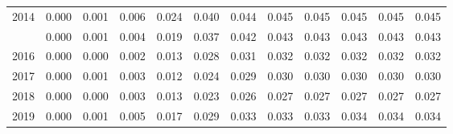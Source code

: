 \documentclass[
]{article}
\begin{document}
\begin{longtable}[t]{lrrrrrrrrrrr}
2014 & 0.000 & 0.001 & 0.006 & 0.024 & 0.040 & 0.044 & 0.045 & 0.045 & 0.045 & 0.045 & 0.045\\
\addlinespace
2015 & 0.000 & 0.001 & 0.004 & 0.019 & 0.037 & 0.042 & 0.043 & 0.043 & 0.043 & 0.043 & 0.043\\
2016 & 0.000 & 0.000 & 0.002 & 0.013 & 0.028 & 0.031 & 0.032 & 0.032 & 0.032 & 0.032 & 0.032\\
2017 & 0.000 & 0.001 & 0.003 & 0.012 & 0.024 & 0.029 & 0.030 & 0.030 & 0.030 & 0.030 & 0.030\\
2018 & 0.000 & 0.000 & 0.003 & 0.013 & 0.023 & 0.026 & 0.027 & 0.027 & 0.027 & 0.027 & 0.027\\
2019 & 0.000 & 0.001 & 0.005 & 0.017 & 0.029 & 0.033 & 0.033 & 0.033 & 0.034 & 0.034 & 0.034\\*
\end{longtable}
\end{document}
